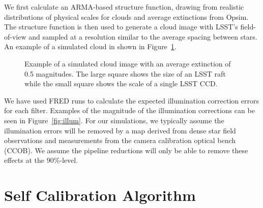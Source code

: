 \documentclass[12pt,preprint]{aastex}
\begin{document}
We first calculate an ARMA-based structure function, drawing from realistic distributions of physical scales for clouds and average extinctions from Opsim.  The structure function is then used to generate a cloud image with LSST's field-of-view and sampled at a resolution similar to the average spacing between stars.  An example of a simulated cloud in shown in Figure~\ref{fig:cloud}.  


\begin{figure}
\caption{Example of a simulated cloud image with an average extinction of 0.5 magnitudes.  The large square shows the size of an LSST raft while the small square shows the scale of a single LSST CCD.  \label{fig:cloud}}
\end{figure}

We have used FRED runs to calculate the expected illumination correction errors for each filter.  Examples of the magnitude of the illumination corrections can be seen in Figure~\ref{fig:illum}.  For our simulations, we typically assume the illumination errors will be removed by a map derived from dense star field observations and measurements from the camera calibration optical bench (CCOB).  We assume the pipeline reductions will only be able to remove these effects at the 90\%-level.  



\section{Self Calibration Algorithm}\label{alg}
\end{document}
